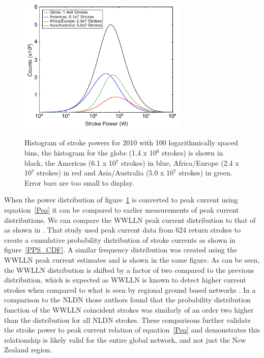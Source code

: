  \begin{figure}[t]
 \noindent\includegraphics[width=19pc,angle=0]{energy/Figures/PPS_Distribution2.pdf}\\
 \caption{Histogram of stroke powers for 2010 with 100 logarithmically spaced bins, the histogram for the globe (1.4 x 10$^8$ strokes) is shown in black, the Americas (6.1 x 10$^7$ strokes) in blue, Africa/Europe (2.4 x 10$^7$ strokes) in red and Asia/Australia (5.0 x 10$^7$ strokes) in green. Error bars are too small to display.}
 \label{distribution}
 \end{figure}
 
When the power distribution of figure~\ref{distribution} is converted to peak current using equation~\ref{Peq} it can be compared to earlier measurements of peak current distributions.
We can compare the WWLLN peak current distribution to that of \citet{Popolansky1972} as shown in \citet{Golde1977}.
That study used peak current data from 624 return strokes to create a cumulative probability distribution of stroke currents as shown in figure~\ref{PPS_CDF}.
A similar frequency distribution was created using the WWLLN peak current estimates and is shown in the same figure.
As can be seen, the WWLLN distribution is shifted by a factor of two compared to the previous distribution, which is expected as WWLLN is known to detect higher current strokes when compared to what is seen by regional ground based networks \citep{Abarca2010}.
In a comparison to the NLDN those authors found that the probability distribution function of the WWLLN coincident strokes was similarly of an order two higher than the distribution for all NLDN strokes.
These comparisons further validate the stroke power to peak current relation of equation~\ref{Peq} and demonstrates this relationship is likely valid for the entire global network, and not just the New Zealand region.

